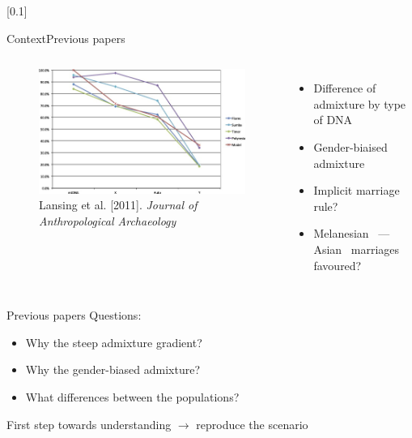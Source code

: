 \documentclass[10pt, aspectratio=43]{beamer}
\begin{document}
[0.1]{}{}{}
\begin{frame}{Context}{Previous papers}
\begin{columns}
  \begin{figure}
    \includegraphics[width=1\textwidth]{../data/lansing-image.jpg}
    \caption{Lansing et al. [2011]. \textit{Journal of
Anthropological Archaeology}}
  \end{figure}

  \begin{itemize}
    \item Difference of admixture by type of DNA
    \item Gender-biaised admixture
    \item Implicit marriage rule?
    \item Melanesian~\mars{} --- Asian~\female{} marriages favoured?
  \end{itemize}

\end{columns}
\end{frame}

\begin{frame}{}{Previous papers}
\color{masseyWhite}
Questions:
\begin{itemize}
  \item Why the steep admixture gradient?
  \item Why the gender-biased admixture?
  \item What differences between the populations?
\end{itemize}
\vspace*{2em}
First step towards understanding $\rightarrow$ reproduce the scenario
\end{frame}
\end{document}
